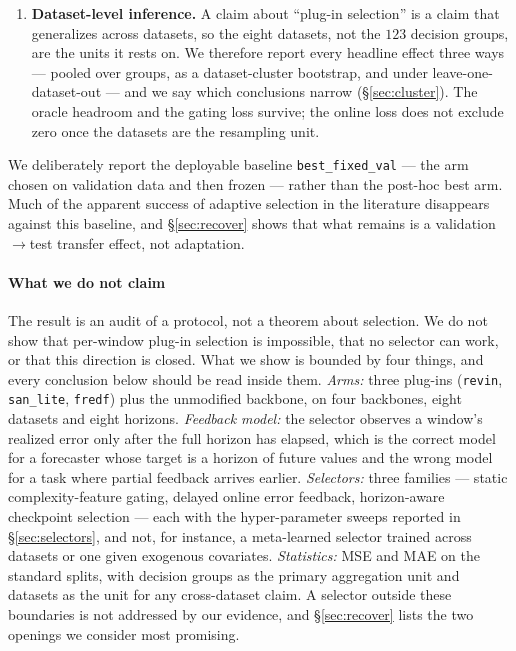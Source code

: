 \documentclass[a4paper,fleqn]{cas-sc}
\newcommand{\arm}[1]{\texttt{#1}}
\begin{document}
\begin{enumerate}
families and two control conditions, all evaluated on identical decision groups
against a deployable baseline, are all negative, with a delay sweep locating the
break-even point at $0.25\times H$ (\S\ref{sec:selectors}). We also
audit the one selection axis that is \emph{not} subject to feedback delay, namely
the lead-time index within a forecast (\S\ref{sec:leadtime}); a quarter-wise
oracle on that axis is worth only $+0.24\%$. Neither axis produced a deployable
gain here, for two different reasons.
\item \textbf{Dataset-level inference.} A claim about ``plug-in selection'' is a
claim that generalizes across datasets, so the eight datasets, not the $123$
decision groups, are the units it rests on. We therefore report every headline
effect three ways --- pooled over groups, as a dataset-cluster bootstrap, and
under leave-one-dataset-out --- and we say which conclusions narrow
(\S\ref{sec:cluster}). The oracle headroom and the gating loss survive; the
online loss does not exclude zero once the datasets are the resampling unit.
\end{enumerate}

We deliberately report the deployable baseline
\arm{best\_fixed\_val} --- the arm chosen on validation data and then frozen ---
rather than the post-hoc best arm. Much of the apparent success of adaptive
selection in the literature disappears against this baseline, and
\S\ref{sec:recover} shows that what remains is a validation$\to$test transfer
effect, not adaptation.

\paragraph{What we do not claim}
The result is an audit of a protocol, not a theorem about selection. We do not
show that per-window plug-in selection is impossible, that no selector can work,
or that this direction is closed. What we show is bounded by four things, and
every conclusion below should be read inside them. \emph{Arms:} three plug-ins
(\arm{revin}, \arm{san\_lite}, \arm{fredf}) plus the unmodified backbone, on four
backbones, eight datasets and eight horizons. \emph{Feedback model:} the selector
observes a window's realized error only after the full horizon has elapsed, which
is the correct model for a forecaster whose target is a horizon of future values
and the wrong model for a task where partial feedback arrives earlier.
\emph{Selectors:} three families --- static complexity-feature gating, delayed
online error feedback, horizon-aware checkpoint selection --- each with the
hyper-parameter sweeps reported in \S\ref{sec:selectors}, and not, for instance, a
meta-learned selector trained across datasets or one given exogenous covariates.
\emph{Statistics:} MSE and MAE on the standard splits, with decision groups as the
primary aggregation unit and datasets as the unit for any cross-dataset claim.
A selector outside these boundaries is not addressed by our evidence, and
\S\ref{sec:recover} lists the two openings we consider most promising.
\end{document}
